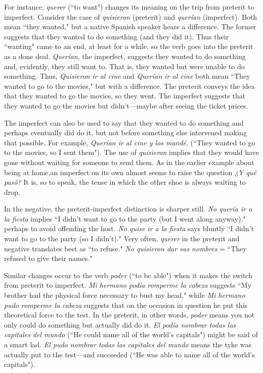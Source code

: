 For instance, \emph{querer} (``to want") changes its meaning on the
trip from preterit to imperfect. Consider the case of \emph{quisieron} (preterit)
and \emph{querían} (imperfect). Both mean ``they wanted," but a native Spanish speaker hears a difference. The former suggests that they wanted to
do something (and they did it). Thus their ``wanting" came to an end,
at least for a while, so the verb goes into the preterit as a done deal.
\emph{Querían}, the imperfect, suggests they wanted to do something and,
evidently, they still want to. That is, they wanted but were unable to
do something. Thus, \emph{Quisieron ir al cine} and \emph{Querían ir al cine} both
mean ``They wanted to go to the movies," but with a difference. The
preterit conveys the idea that they wanted to go the movies, so they
went. The imperfect suggests that they wanted to go the movies but
didn't---maybe after seeing the ticket prices.

The imperfect can also be used to say that they wanted to do
something and perhaps eventually did do it, but not before something
else intervened making that possible. For example, \emph{Querían ir al cine
y los mandé}, (``They wanted to go to the movies, so I sent them"). The
use of \emph{quisieron} implies that they would have gone without waiting
for someone to send them. As in the earlier example about being at
home,an imperfect on its own almost seems to raise the question \emph{¿Y
qué pasó?} It is, so to speak, the tense in which the other shoe is always
waiting to drop.

In the negative, the preterit-imperfect distinction is sharper
still. \emph{No quería ir a la fiesta} implies ``I didn't want to go to the party
(but I went along anyway)," perhaps to avoid offending the host. \emph{No
quise ir a la fiesta} says bluntly ``I didn't want to go to the party (so I
didn't)." Very often, \emph{querer} in the preterit and negative translates best
as ``to refuse." \emph{No quisieron dar sus nombres} = ``They refused to give
their names."

Similar changes occur to the verb \emph{poder} (``to be able") when it
makes the switch from preterit to imperfect. \emph{Mi hermano podía romperme la cabeza} suggests ``My brother had the physical force necessary
to bust my head," while \emph{Mi hermano pudo romperme la cabeza} suggests that on the occasion in question he put this theoretical force to
the test. In the preterit, in other words, \emph{poder} means you not only
could do something but actually did do it. \emph{El podía nombrar todas las
capitales del mundo} (``He could name all of the world's capitals")
might be said of a smart lad. \emph{El pudo nombrar todas las capitales del
mundo} means the tyke was actually put to the test---and succeeded
(``He was able to name all of the world's capitals").

